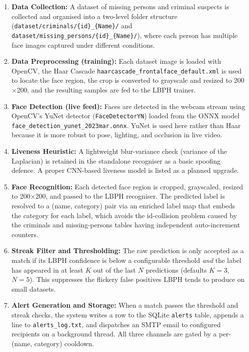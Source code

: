 \documentclass[11pt]{report}
\begin{document}
\begin{enumerate}
    \item \textbf{Data Collection:} A dataset of missing persons and criminal suspects is collected and organised into a two-level folder structure (\texttt{dataset/criminals/\{id\}\_\{Name\}/} and \texttt{dataset/missing\_persons/\{id\}\_\{Name\}/}), where each person has multiple face images captured under different conditions.

    \item \textbf{Data Preprocessing (training):} Each dataset image is loaded with OpenCV, the Haar Cascade \texttt{haarcascade\_frontalface\_default.xml} is used to locate the face region, the crop is converted to grayscale and resized to 200$\times$200, and the resulting samples are fed to the LBPH trainer.

    \item \textbf{Face Detection (live feed):} Faces are detected in the webcam stream using OpenCV's YuNet detector (\texttt{FaceDetectorYN}) loaded from the ONNX model \texttt{face\_detection\_yunet\_2023mar.onnx}. YuNet is used here rather than Haar because it is more robust to pose, lighting, and occlusion in live video.

    \item \textbf{Liveness Heuristic:} A lightweight blur-variance check (variance of the Laplacian) is retained in the standalone recogniser as a basic spoofing defence. A proper CNN-based liveness model is listed as a planned upgrade.

    \item \textbf{Face Recognition:} Each detected face region is cropped, grayscaled, resized to 200$\times$200, and passed to the LBPH recogniser. The predicted label is resolved to a (name, category) pair via an enriched label map that embeds the category for each label, which avoids the id-collision problem caused by the criminals and missing-persons tables having independent auto-increment counters.

    \item \textbf{Streak Filter and Thresholding:} The raw prediction is only accepted as a match if its LBPH confidence is below a configurable threshold \emph{and} the label has appeared in at least $K$ out of the last $N$ predictions (defaults $K=3$, $N=5$). This suppresses the flickery false positives LBPH tends to produce on small datasets.

    \item \textbf{Alert Generation and Storage:} When a match passes the threshold and streak checks, the system writes a row to the SQLite \texttt{alerts} table, appends a line to \texttt{alerts\_log.txt}, and dispatches an SMTP email to configured recipients on a background thread. All three channels are gated by a per-(name, category) cooldown.


\end{enumerate}
\end{document}
